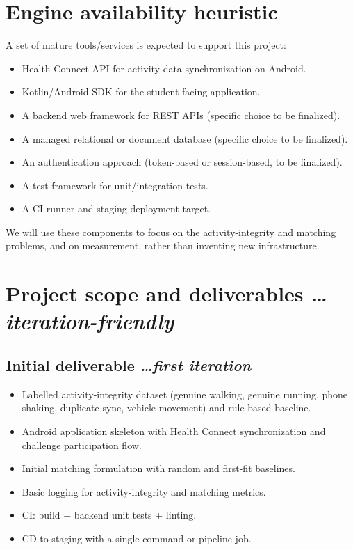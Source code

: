 \documentclass[11pt,a4paper]{article}
\newcommand{\BvrHint}[1]{%
  {\normalfont\normalsize\itshape\hfill #1}}
\begin{document}
\section{Engine availability heuristic}
A set of mature tools/services is expected to support this project:
\begin{itemize}[leftmargin=0.7cm]
    \item Health Connect API for activity data synchronization on Android.
    \item Kotlin/Android SDK for the student-facing application.
    \item A backend web framework for REST APIs (specific choice to be finalized).
    \item A managed relational or document database (specific choice to be finalized).
    \item An authentication approach (token-based or session-based, to be finalized).
    \item A test framework for unit/integration tests.
    \item A CI runner and staging deployment target.
\end{itemize}
We will use these components to focus on the activity-integrity and
matching problems, and on measurement, rather than inventing new
infrastructure.

\section{Project scope and deliverables %
\BvrHint{\ldots iteration-friendly}}
\subsection{Initial deliverable %
\BvrHint{\ldots first iteration}}
\begin{itemize}[leftmargin=0.7cm]
    \item Labelled activity-integrity dataset (genuine walking, genuine running, phone shaking, duplicate sync, vehicle movement) and rule-based baseline.
    \item Android application skeleton with Health Connect synchronization and challenge participation flow.
    \item Initial matching formulation with random and first-fit baselines.
    \item Basic logging for activity-integrity and matching metrics.
    \item CI: build + backend unit tests + linting.
    \item CD to staging with a single command or pipeline job.
\end{itemize}
\end{document}
